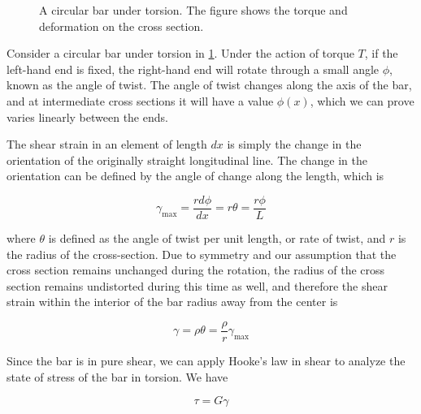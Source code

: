 \documentclass[a4paper,openany,12pt]{book}
\begin{document}
\begin{figure}[h]
  \centering
  \caption{A circular bar under torsion. The figure shows the torque and deformation on the cross section.}
  \label{fig: 3d torsional deformation}
\end{figure}

Consider a circular bar under torsion in \ref{fig: 3d torsional deformation}.
Under the action of torque \(T\), if the left-hand end is fixed, the
right-hand end will rotate through a small angle \(\phi\), known as the
angle of twist. The angle of twist changes along the axis of the bar,
and at intermediate cross sections it will have a value \(\phi(x)\), which
we can prove varies linearly between the ends.

The shear strain in an element of length \(dx\) is simply the change in
the orientation of the originally straight longitudinal line. The change
in the orientation can be defined by the angle of change along the
length, which is

$$\gamma _{\max } = \frac{rd\phi }{dx} = r\theta  = \frac{r\phi }{L}$$

where \(\theta\) is defined as the angle of twist per unit length, or rate
of twist, and \(r\) is the radius of the cross-section. Due to symmetry
and our assumption that the cross section remains unchanged during the
rotation, the radius of the cross section remains undistorted during
this time as well, and therefore the shear strain within the interior of
the bar radius away from the center is

$$ \gamma  = \rho \theta  = \frac{\rho }{r}\gamma _{\max }$$

Since the bar is in pure shear, we can apply Hooke's law in shear to
analyze the state of stress of the bar in torsion. We have

$$\tau  = G\gamma$$
\end{document}
